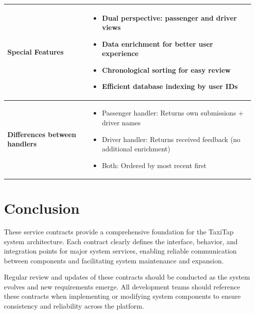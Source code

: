 \documentclass[11pt,a4paper]{article}
\begin{document}
\begin{longtable}{|p{3cm}|p{12cm}|}
\hline
\textbf{Special Features} & 
\begin{itemize}[nosep]
\item Dual perspective: passenger and driver views
\item Data enrichment for better user experience
\item Chronological sorting for easy review
\item Efficient database indexing by user IDs
\end{itemize} \\
\hline
\textbf{Differences between handlers} & 
\begin{itemize}[nosep]
\item Passenger handler: Returns own submissions + driver names
\item Driver handler: Returns received feedback (no additional enrichment)
\item Both: Ordered by most recent first
\end{itemize} \\
\hline
\end{longtable}

\section{Conclusion}

These service contracts provide a comprehensive foundation for the TaxiTap system architecture. Each contract clearly defines the interface, behavior, and integration points for major system services, enabling reliable communication between components and facilitating system maintenance and expansion.

Regular review and updates of these contracts should be conducted as the system evolves and new requirements emerge. All development teams should reference these contracts when implementing or modifying system components to ensure consistency and reliability across the platform.
\end{document}
